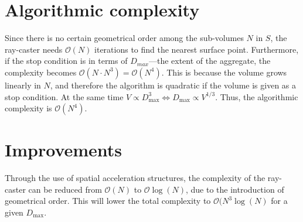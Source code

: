 \documentclass[a4paper,10pt]{scrartcl}
\begin{document}
\section{Algorithmic complexity}
Since there is no certain geometrical order among the sub-volumes $N$ in $S$, the ray-caster needs $\mathcal{O}(N)$ iterations to find the nearest surface point. Furthermore, if the stop condition is in terms of $D_{max}$---the extent of the aggregate, the complexity becomes $\mathcal{O}(N\cdot N^3)=\mathcal{O}(N^4)$. This is because the volume grows linearly in $N$, and therefore the algorithm is quadratic if the volume is given as a stop condition. At the same time $V\propto D_\text{max}^3\iff D_\text{max}\propto V^{1/3}$. Thus, the algorithmic complexity is $\mathcal{O}(N^4)$.

\section{Improvements}
Through the use of spatial acceleration structures, the complexity of the ray-caster can be reduced from $\mathcal{O}(N)$ to $\mathcal{O}{\log(N)}$, due to the introduction of geometrical order. This will lower the total complexity to $\mathcal{O}(N^3\log\left(N\right)$ for a given $D_\text{max}$.
\end{document}
